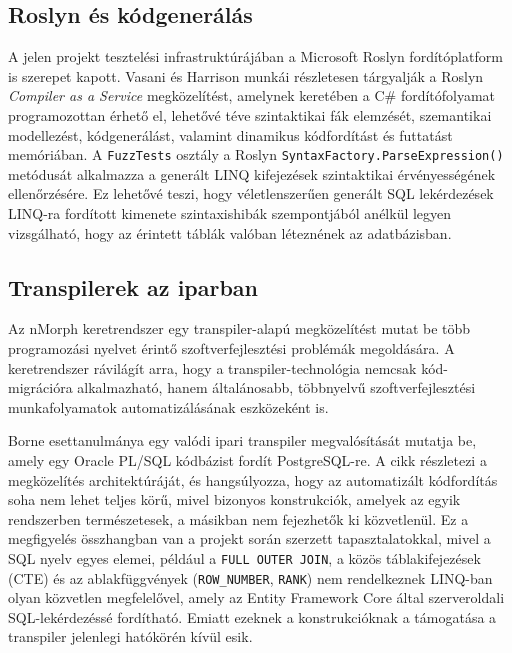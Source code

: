 \documentclass[a4paper,12pt]{article}
\begin{document}
\subsection{Roslyn és kódgenerálás}

A jelen projekt tesztelési infrastruktúrájában a Microsoft Roslyn fordítóplatform is szerepet kapott. Vasani \cite{vasani2017roslyn} és Harrison \cite{harrison2017codegen} munkái részletesen tárgyalják a Roslyn \textit{Compiler as a Service} megközelítést, amelynek keretében a C\# fordítófolyamat programozottan érhető el, lehetővé téve szintaktikai fák elemzését, szemantikai modellezést, kódgenerálást, valamint dinamikus kódfordítást és futtatást memóriában. A \texttt{FuzzTests} osztály a Roslyn \texttt{SyntaxFactory.ParseExpression()} metódusát alkalmazza a generált LINQ kifejezések szintaktikai érvényességének ellenőrzésére. Ez lehetővé teszi, hogy véletlenszerűen generált SQL lekérdezések LINQ-ra fordított kimenete szintaxishibák szempontjából anélkül legyen vizsgálható, hogy az érintett táblák valóban léteznének az adatbázisban.

\subsection{Transpilerek az iparban}

Az nMorph keretrendszer \cite{nmorph2023} egy transpiler-alapú megközelítést mutat be több programozási nyelvet érintő szoftverfejlesztési problémák megoldására. A keretrendszer rávilágít arra, hogy a transpiler-technológia nemcsak kód-migrációra alkalmazható, hanem általánosabb, többnyelvű szoftverfejlesztési munkafolyamatok automatizálásának eszközeként is.

Borne \cite{borne2021transpiler} esettanulmánya egy valódi ipari transpiler megvalósítását mutatja be, amely egy Oracle PL/SQL kódbázist fordít PostgreSQL-re. A cikk részletezi a megközelítés architektúráját, és hangsúlyozza, hogy az automatizált kódfordítás soha nem lehet teljes körű, mivel bizonyos konstrukciók, amelyek az egyik rendszerben természetesek, a másikban nem fejezhetők ki közvetlenül. Ez a megfigyelés összhangban van a projekt során szerzett tapasztalatokkal, mivel a SQL nyelv egyes elemei, például a \texttt{FULL OUTER JOIN}, a közös táblakifejezések (CTE) és az ablakfüggvények (\texttt{ROW\_NUMBER}, \texttt{RANK}) nem rendelkeznek LINQ-ban olyan közvetlen megfelelővel, amely az Entity Framework Core által szerveroldali SQL-lekérdezéssé fordítható. Emiatt ezeknek a konstrukcióknak a támogatása a transpiler jelenlegi hatókörén kívül esik.
\end{document}
